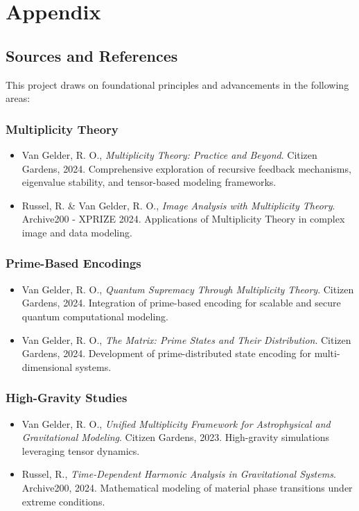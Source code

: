 \documentclass{article}
\theoremstyle{plain}
\begin{document}
\section{Appendix}

\subsection{Sources and References}
This project draws on foundational principles and advancements in the following areas:

\subsubsection{Multiplicity Theory}
\begin{itemize}
    \item Van Gelder, R. O., \textit{Multiplicity Theory: Practice and Beyond}. Citizen Gardens, 2024. Comprehensive exploration of recursive feedback mechanisms, eigenvalue stability, and tensor-based modeling frameworks.
    \item Russel, R. \& Van Gelder, R. O., \textit{Image Analysis with Multiplicity Theory}. Archive200 - XPRIZE 2024. Applications of Multiplicity Theory in complex image and data modeling.
\end{itemize}

\subsubsection*{Prime-Based Encodings}
\begin{itemize}
    \item Van Gelder, R. O., \textit{Quantum Supremacy Through Multiplicity Theory}. Citizen Gardens, 2024. Integration of prime-based encoding for scalable and secure quantum computational modeling.
    \item Van Gelder, R. O., \textit{The Matrix: Prime States and Their Distribution}. Citizen Gardens, 2024. Development of prime-distributed state encoding for multi-dimensional systems.
\end{itemize}

\subsubsection{High-Gravity Studies}
\begin{itemize}
    \item Van Gelder, R. O., \textit{Unified Multiplicity Framework for Astrophysical and Gravitational Modeling}. Citizen Gardens, 2023. High-gravity simulations leveraging tensor dynamics.
    \item Russel, R., \textit{Time-Dependent Harmonic Analysis in Gravitational Systems}. Archive200, 2024. Mathematical modeling of material phase transitions under extreme conditions.
\end{itemize}
\end{document}
